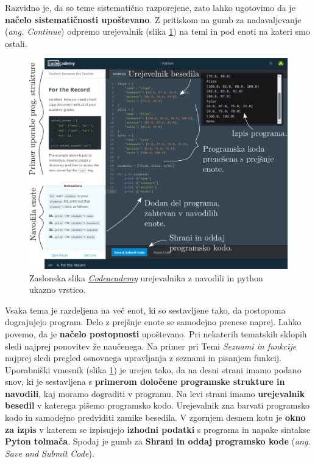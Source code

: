 Razvidno je, da so teme sistematično razporejene, zato lahko ugotovimo
da je \textbf{načelo sistematičnosti upoštevano}. Z pritiskom na gumb
za nadavaljevanje (\emph{ang. Continue}) odpremo urejevalnik (slika
\ref{fig:scr:web:codeacademy:ide}) na temi in pod enoti na kateri smo
ostali.

\begin{figure}[h!]
  \centering
    \includegraphics [width=0.65\linewidth, keepaspectratio =
   1] {./images/sc_web/codeacademy_IDE_02.png}
  \caption{Zaslonska slika
      \emph{\href{https://www.codecademy.com/}{Codeacademy}}
      \cite{web:codeacademy} urejevalnika z navodili in python ukazno
      vrstico.} %
    \label{fig:scr:web:codeacademy:ide}
\end{figure}

Vsaka tema je razdeljena na več enot, ki so sestavljene tako, da
postopoma dograjujejo program. Delo z prejšnje enote se samodejno
prenese naprej. Lahko povemo, da je \textbf{načelo postopnosti}
upoštevano. Pri nekaterih tematskih sklopih sledi najprej ponovitev že
naučenega. Na primer pri Temi \emph{Seznami in funkcije} najprej sledi
pregled osnovnega upravljanja z seznami in pisanjem funkcij.
Uporabniški vmesnik (slika \ref{fig:scr:web:codeacademy:ide}) je
urejen tako, da na desni strani imamo podano snov, ki je sestavljena s
\textbf{primerom določene programske strukture in navodili}, kaj
moramo dograditi v programu. Na levi strani imamo \textbf{urejevalnik
  besedil} v katerega pišemo programsko kodo. Urejevalnik zna barvati
programsko kodo in samodejno predviditi zamike besedila. V zgornjem
desnem kotu je \textbf{okno za izpis} v katerem se izpisujejo
\textbf{izhodni podatki} s programa in napake sintakse \textbf{Pyton
  tolmača}. Spodaj je gumb za \textbf{Shrani in oddaj programsko kode}
(\emph{ang. Save and Submit Code}).

